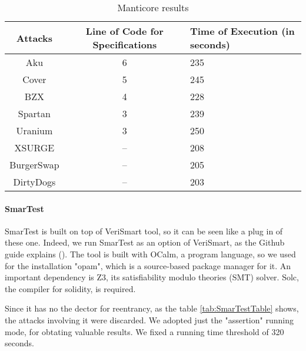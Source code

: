 \begin{center}
\begin{table*}
    \caption{Manticore results}
        \label{tab:ManticoreTable}
        \begin{tabular}{ccl}
        \toprule
            Attacks & Line of Code for Specifications & Time of Execution (in seconds)\\
            \midrule
            Aku & 6 & 235  \\ 
            Cover & 5 & 245\\ 
            BZX  & 4 & 228\\ 
            Spartan & 3 & 239 \\ 
            Uranium  & 3 & 250\\ 
            XSURGE & -- & 208\\ 
            BurgerSwap  &  -- & 205 \\ 
            DirtyDogs & -- & 203 \\
        \bottomrule
    \end{tabular}
\end{table*}
\end{center}

\paragraph{SmarTest} SmarTest is built on top of VeriSmart tool, so it can be seen like a plug in of these one. Indeed, we run SmarTest as an option of VeriSmart, 
as the Github guide explains (\cite{SmarTestGitHub}). The tool is built with OCalm, a program language, so we used for the installation "opam", which is a source-based package manager for it.
An important dependency is Z3, its satisfiability modulo theories (SMT) solver. Solc, the compiler for solidity, is required.

Since it has no the dector for reentrancy, as the table \autoref{tab:SmarTestTable} shows, the attacks involving it were discarded. We adopted just the "assertion" running mode, for obtating valuable results. 
We fixed a running time threshold of 320 seconds.

